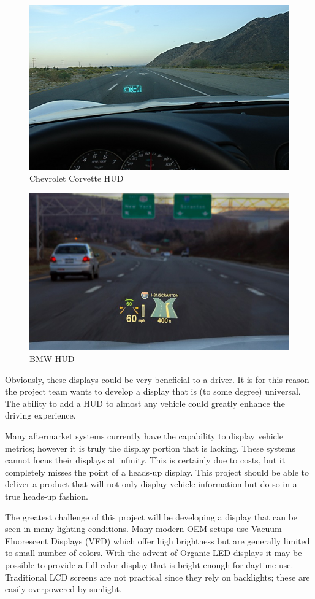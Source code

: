 \begin{figure}
	\includegraphics[width=\textwidth]{img/CorvetteHUD.jpg}
	\caption{Chevrolet Corvette HUD}
	\label{fig:CorvetteHUD}
\end{figure}

\begin{figure}
	\includegraphics[width=\textwidth]{img/BMWHUD.jpg}
	\caption{BMW HUD}
	\label{fig:BMWHUD}
\end{figure}

Obviously, these displays could be very beneficial to a driver. It is for
this reason the project team wants to develop a display that is (to some
degree) universal. The ability to add a HUD to almost any vehicle could
greatly enhance the driving experience.

Many aftermarket systems currently have the capability to display vehicle
metrics; however it is truly the display portion that is lacking. These
systems cannot focus their displays at infinity. This is certainly due to
costs, but it completely misses the point of a heads-up display. This
project should be able to deliver a product that will not only display
vehicle information but do so in a true heads-up fashion.

The greatest challenge of this project will be developing a display that
can be seen in many lighting conditions. Many modern OEM setups use Vacuum
Fluorescent Displays (VFD) which offer high brightness but are generally
limited to small number of colors. With the advent of Organic LED displays
it may be possible to provide a full color display that is bright enough
for daytime use. Traditional LCD screens are not practical since they rely
on backlights; these are easily overpowered by sunlight.
